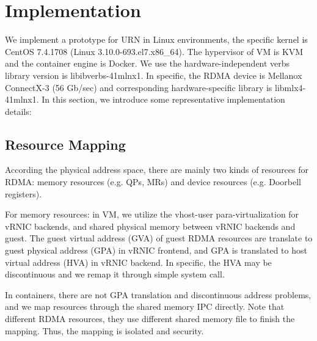 \section{Implementation}
 We implement a prototype for URN in Linux environments, the specific kernel is CentOS 7.4.1708 (Linux 3.10.0-693.el7.x86\_64). The hypervisor of VM is KVM and the container engine is Docker. We use the hardware-independent verbs library version is libibverbs-41mlnx1. In specific, the RDMA device is Mellanox ConnectX-3 (56 Gb/sec) and corresponding hardware-specific library is libmlx4-41mlnx1. In this section, we introduce some representative implementation details:
 
 \subsection{Resource Mapping}
According the physical address space, there are mainly two kinds of resources for RDMA: memory resources (e.g. QPs, MRs) and device resources (e.g. Doorbell registers). 
 
 For memory resources: in VM, we utilize the vhost-user para-virtualization for vRNIC backends, and shared physical memory between vRNIC backends and guest. The guest virtual address (GVA) of guest RDMA resources are translate to guest physical address (GPA) in vRNIC frontend, and GPA is translated to host virtual address (HVA) in vRNIC backend. In specific, the HVA may be discontinuous and we remap it through simple system call.
 
 In containers, there are not GPA translation and discontinuous address problems, and we map resources through the shared memory IPC directly. Note that different RDMA resources, they use different shared memory file to finish the mapping. Thus, the mapping is isolated and security.
 
